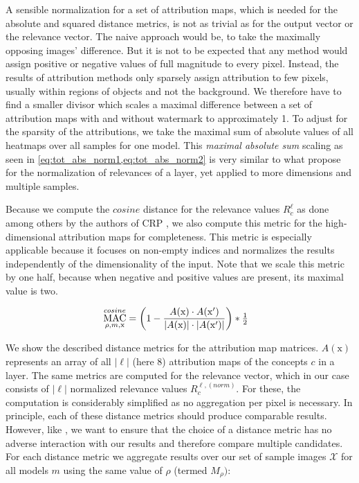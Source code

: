 A sensible normalization for a set of attribution maps, which is needed for the absolute and squared distance metrics, is not as trivial as for the output vector or the relevance vector. The naive approach would be, to take the maximally opposing images' difference. But it is not to be expected that any method would assign positive or negative values of full magnitude to every pixel. Instead, the results of attribution methods only sparsely assign attribution to few pixels, usually within regions of objects and not the background. 
We therefore have to find a smaller divisor which scales a maximal difference between a set of attribution maps with and without watermark to approximately 1.
To adjust for the sparsity of the attributions, we take the maximal sum of absolute values of all heatmaps over all samples for one model. This \textit{maximal absolute sum} scaling as seen in \cref{eq:tot_abs_norm1,eq:tot_abs_norm2} is very similar to what \citet{Achtibat2022} propose for the normalization of relevances of a layer, yet applied to more dimensions and multiple samples.

Because we compute the $cosine$ distance for the relevance values $R_c^{\ell}$ as done among others by the authors of CRP \citep{Achtibat2023}, we also compute this metric for the high-dimensional attribution maps for completeness. This metric is especially applicable because it focuses on non-empty indices and normalizes the results independently of the dimensionality of the input. Note that we scale this metric by one half, because when negative and positive values are present, its maximal value is two.

\begin{align}
\displaystyle 
& \operatorname*{MAC}_{\rho, m,\mathrm{x}}^{cosine} = \left( 1- 
\frac{A(\mathrm{x}) \cdot A(\mathrm{x'}) }{|A(\mathrm{x})|\cdot |A(\mathrm{x'})|}\right) * \tfrac{1}{2} &
\end{align}

We show the described distance metrics for the attribution map matrices. $A(\mathrm{x})$ represents an array of all $|\ell|$ (here 8) attribution maps of the concepts $c$ in a layer. The same metrics are computed for the relevance vector, which in our case consists of $|\ell|$ normalized relevance values $R_{c}^{\ell,(norm)}$. For these, the computation is considerably simplified as no aggregation per pixel is necessary. In principle, each of these distance metrics should produce comparable results. However, like \citet{Karimi2023}, we want to ensure that the choice of a distance metric has no adverse interaction with our results and therefore compare multiple candidates. 
For each distance metric we aggregate results over our set of sample images $\mathcal{X}$ for all models $m$ using the same value of $\rho$ (termed $M_{\rho})$:

